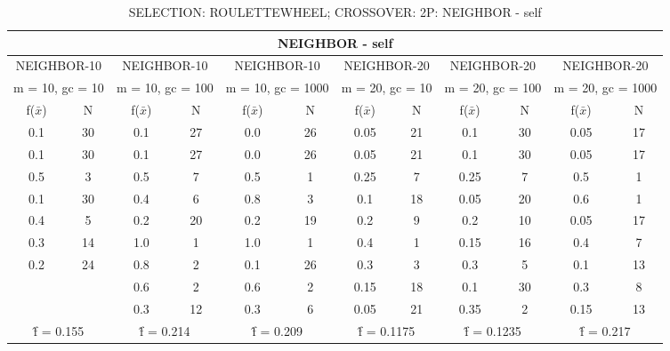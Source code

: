 \begin{table}[H]
	\centering
	\caption{SELECTION: ROULETTEWHEEL; CROSSOVER: 2P: NEIGHBOR - self}
	\begin{adjustbox}{width=1\textwidth}
		\begin{tabular}{ |c|c||c|c||c|c||c|c||c|c||c|c| }
			\hline
			\multicolumn{12}{|c|}{NEIGHBOR - self} \\
			\hline
			\multicolumn{2}{|c||}{NEIGHBOR-10} & \multicolumn{2}{c||}{NEIGHBOR-10} & \multicolumn{2}{c||}{NEIGHBOR-10} & \multicolumn{2}{c||}{NEIGHBOR-20} & \multicolumn{2}{c||}{NEIGHBOR-20} & \multicolumn{2}{c|}{NEIGHBOR-20}\\
			\hline
			\multicolumn{2}{|c||}{m = 10, gc = 10} & \multicolumn{2}{c||}{m = 10, gc = 100} & \multicolumn{2}{c||}{m = 10, gc = 1000} & \multicolumn{2}{c||}{m = 20, gc = 10} & \multicolumn{2}{c||}{m = 20, gc = 100} & \multicolumn{2}{c|}{m = 20, gc = 1000}\\
			\hline
			f($\bar{x}$) & N & f($\bar{x}$) & N & f($\bar{x}$) & N & f($\bar{x}$) & N & f($\bar{x}$) & N & f($\bar{x}$) & N\\
			\hline
			\hline
			0.1 & 30 & 0.1 & 27 & 0.0 & 26 & 0.05 & 21 & 0.1 & 30 & 0.05 & 17\\
			\hline
			0.1 & 30 & 0.1 & 27 & 0.0 & 26 & 0.05 & 21 & 0.1 & 30 & 0.05 & 17\\
			0.5 & 3 & 0.5 & 7 & 0.5 & 1 & 0.25 & 7 & 0.25 & 7 & 0.5 & 1\\
			0.1 & 30 & 0.4 & 6 & 0.8 & 3 & 0.1 & 18 & 0.05 & 20 & 0.6 & 1\\
			0.4 & 5 & 0.2 & 20 & 0.2 & 19 & 0.2 & 9 & 0.2 & 10 & 0.05 & 17\\
			0.3 & 14 & 1.0 & 1 & 1.0 & 1 & 0.4 & 1 & 0.15 & 16 & 0.4 & 7\\
			0.2 & 24 & 0.8 & 2 & 0.1 & 26 & 0.3 & 3 & 0.3 & 5 & 0.1 & 13\\
			&   & 0.6 & 2 & 0.6 & 2 & 0.15 & 18 & 0.1 & 30 & 0.3 & 8\\
			&   & 0.3 & 12 & 0.3 & 6 & 0.05 & 21 & 0.35 & 2 & 0.15 & 13\\
			\hline
			\multicolumn{2}{|c||}{\^{f} = 0.155} & \multicolumn{2}{c||}{\^{f} = 0.214} & \multicolumn{2}{c||}{\^{f} = 0.209} & \multicolumn{2}{c||}{\^{f} = 0.1175} & \multicolumn{2}{c||}{\^{f} = 0.1235} & \multicolumn{2}{c|}{\^{f} = 0.217}\\
			\hline
		\end{tabular}
	\end{adjustbox}
\end{table}
